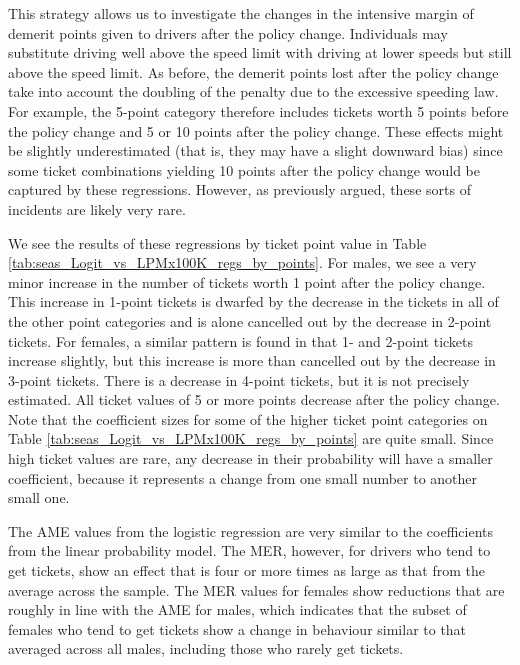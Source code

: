 This strategy allows us to investigate the changes in the intensive margin of 
demerit points given to drivers after the policy change. 
Individuals may substitute driving well above the speed limit with driving at lower speeds 
but still above the speed limit. 
As before, the demerit points lost after the policy change take into account 
the doubling of the penalty due to the excessive speeding law. 
For example, the 5-point category therefore includes tickets 
worth 5 points before the policy change and 5 or 10 points after the policy change. 
These effects might be slightly underestimated (that is, they may have a slight downward bias) 
since some ticket combinations yielding 10 points after the policy change 
would be captured by these regressions. 
However, as previously argued, these sorts of incidents are likely very rare. 





We see the results of these regressions by ticket point value in 
Table \ref{tab:seas_Logit_vs_LPMx100K_regs_by_points}. 
For males, we see a very minor increase in the number of tickets 
worth 1 point after the policy change. 
This increase in 1-point tickets is dwarfed by the decrease in the tickets 
in all of the other point categories and is alone cancelled out 
by the decrease in 2-point tickets. 
For females, a similar pattern is found in that 1- and 2-point tickets increase slightly,
but this increase is more than cancelled out by the decrease in 3-point tickets. 
There is a decrease in 4-point tickets, but it is not precisely estimated. 
All ticket values of 5 or more points decrease after the policy change. 
Note that the coefficient sizes for some of the higher ticket point categories on 
Table \ref{tab:seas_Logit_vs_LPMx100K_regs_by_points}
are quite small. Since high ticket values are rare, any decrease in their probability will have a smaller coefficient, 
because it represents a change from one small number to another small one.

The AME values from the logistic regression are very similar to
the coefficients from the linear probability model. 
The MER, however, for drivers who tend to get tickets, 
show an effect that is four or more times as large 
as that from the average across the sample. 
The MER values for females show reductions 
that are roughly in line with the AME for males, 
which indicates that the subset of females who tend to get tickets
show a change in behaviour similar to that 
averaged across all males, including those who rarely get tickets. 


